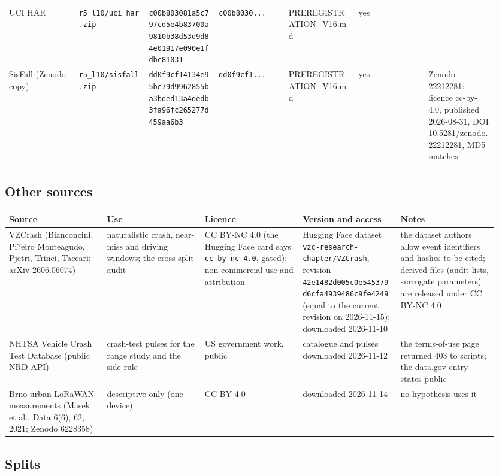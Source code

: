 {\begin{longtable}{p{0.136\linewidth}p{0.136\linewidth}p{0.136\linewidth}p{0.136\linewidth}p{0.136\linewidth}p{0.136\linewidth}p{0.136\linewidth}}
UCI HAR & \texttt{r5\_l10/uci\_har.zip} & \texttt{c00b803081a5c797cd5e4b83700a9810b38d53d9d84e01917e090e1fdbc81031} & \texttt{c00b8030...} & PREREGISTRATION\_V16.md & yes &  \\
SisFall (Zenodo copy) & \texttt{r5\_l10/sisfall.zip} & \texttt{dd0f9cf14134e95be79d9962855ba3bded13a4dedb3fa96fc265277d459aa6b3} & \texttt{dd0f9cf1...} & PREREGISTRATION\_V16.md & yes & Zenodo 22212281: licence cc-by-4.0, published 2026-08-31, DOI 10.5281/zenodo.22212281, MD5 matches \\
\bottomrule
\end{longtable}}

\subsection*{Other sources}

{\scriptsize\raggedright
\begin{longtable}{p{0.190\linewidth}p{0.190\linewidth}p{0.190\linewidth}p{0.190\linewidth}p{0.190\linewidth}}
\toprule
Source & Use & Licence & Version and access & Notes \\
\midrule
\endhead
VZCrash (Bianconcini, Pi?eiro Monteagudo, Pjetri, Trinci, Taccari; arXiv 2606.06074) & naturalistic crash, near-miss and driving windows; the cross-split audit & CC BY-NC 4.0 (the Hugging Face card says \texttt{cc-by-nc-4.0}, gated); non-commercial use and attribution & Hugging Face dataset \texttt{vzc-research-chapter/VZCrash}, revision \texttt{42e1482d005c0e545379d6cfa4939486c9fe4249} (equal to the current revision on 2026-11-15); downloaded 2026-11-10 & the dataset authors allow event identifiers and hashes to be cited; derived files (audit lists, surrogate parameters) are released under CC BY-NC 4.0 \\
NHTSA Vehicle Crash Test Database (public NRD API) & crash-test pulses for the range study and the side rule & US government work, public & catalogue and pulses downloaded 2026-11-12 & the terms-of-use page returned 403 to scripts; the data.gov entry states public \\
Brno urban LoRaWAN measurements (Masek et al., Data 6(6), 62, 2021; Zenodo 6228358) & descriptive only (one device) & CC BY 4.0 & downloaded 2026-11-14 & no hypothesis uses it \\
\bottomrule
\end{longtable}}

\subsection*{Splits}

